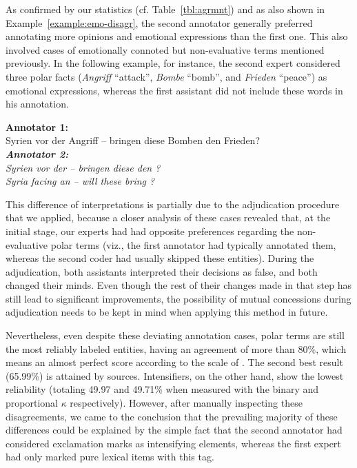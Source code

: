 As confirmed by our statistics (cf. Table~\ref{tbl:agrmnt}) and as
also shown in Example~\ref{example:emo-disagr}, the second annotator
generally preferred annotating more opinions and emotional expressions
than the first one.  This also involved cases of emotionally connoted
but non-evaluative terms mentioned previously. In the following
example, for instance, the second expert considered three polar facts
(\emph{Angriff} ``attack'', \emph{Bombe} ``bomb'', and \emph{Frieden}
``peace'') as emotional expressions, whereas the first assistant did
not include these words in his annotation.

{ \renewcommand{\thesection}{\arabic{section}}
  \begin{example}\label{example:emo-disagr}
    \textbf{Annotator 1:}\\
    \upshape{}Syrien vor der Angriff -- bringen diese Bomben den Frieden?\\[0.8em]\itshape
    \textbf{Annotator 2:}\\
    \upshape{}Syrien vor der \emoexpression{\textcolor{red}{Angriff}}
    -- bringen diese \emoexpression{\textcolor{red}{Bomben}} den
    \emoexpression{\textcolor{red}{Frieden}}?\\[0.8em]

    \noindent\itshape{}Syria facing an
    \upshape{}\itshape{}
    -- will these
    \upshape{}\itshape{}
    bring
    \upshape{}\itshape{}?
  \end{example}
}

This difference of interpretations is partially due to the
adjudication procedure that we applied, because a closer analysis of
these cases revealed that, at the initial stage, our experts had had
opposite preferences regarding the non-evaluative polar terms (viz.,
the first annotator had typically annotated them, whereas the second
coder had usually skipped these entities).  During the adjudication,
both assistants interpreted their decisions as false, and both changed
their minds.  Even though the rest of their changes made in that step
has still lead to significant improvements, the possibility of mutual
concessions during adjudication needs to be kept in mind when applying
this method in future.

Nevertheless, even despite these deviating annotation cases, polar
terms are still the most reliably labeled entities, having an
agreement of more than $80\%$, which means an almost perfect score
according to the scale of \citet{Landis:77}.  The second best result
(65.99\%) is attained by sources.  Intensifiers, on the other hand,
show the lowest reliability (totaling 49.97 and 49.71\% when measured
with the binary and proportional $\kappa$ respectively).  However,
after manually inspecting these disagreements, we came to the
conclusion that the prevailing majority of these differences could be
explained by the simple fact that the second annotator had considered
exclamation marks as intensifying elements, whereas the first expert
had only marked pure lexical items with this tag.

